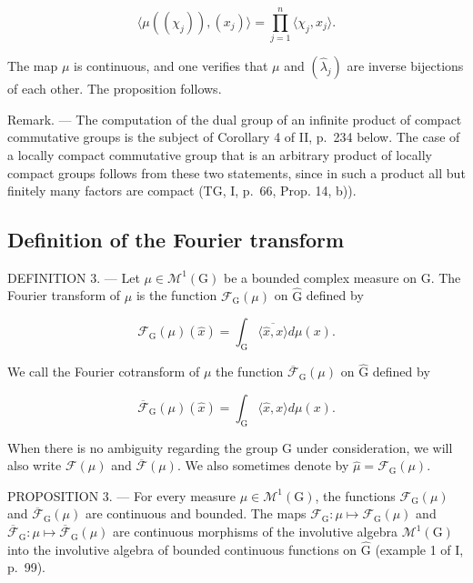\[
\langle \mu ((\chi_ {j})), (x _ {j}) \rangle = \prod_ {j = 1} ^ {n} \langle \chi_ {j}, x _ {j} \rangle .
\]

The map \(\mu\) is continuous, and one verifies that \(\mu\) and \((\widehat{\lambda}_j)\) are inverse bijections of each other. The proposition follows.

Remark. --- The computation of the dual group of an infinite product of compact commutative groups is the subject of Corollary 4 of II, p.~234 below. The case of a locally compact commutative group that is an arbitrary product of locally compact groups follows from these two statements, since in such a product all but finitely many factors are compact (TG, I, p.~66, Prop. 14, b)).

\subsection{Definition of the Fourier transform}

DEFINITION 3. --- Let \(\mu \in \mathcal{M}^{1}(\mathrm{G})\) be a bounded complex measure on G. The Fourier transform of \(\mu\) is the function \(\mathcal{F}_{\mathrm{G}}(\mu)\) on \(\widehat{\mathrm{G}}\) defined by

\[
\mathcal {F} _ {\mathrm{G}} (\mu) (\widehat {x}) = \int_ {\mathrm{G}} \overline {{\langle \widehat {x} , x \rangle}} d \mu (x).\tag{5}
\]

We call the Fourier cotransform of \(\mu\) the function \(\overline{\mathcal{F}}_{\mathrm{G}}(\mu)\) on \(\widehat{\mathrm{G}}\) defined by

\[
\overline {{\mathcal {F}}} _ {\mathrm{G}} (\mu) (\widehat {x}) = \int_ {\mathrm{G}} \langle \widehat {x}, x \rangle d \mu (x).\tag{6}
\]

When there is no ambiguity regarding the group G under consideration, we will also write \(\mathcal{F}(\mu)\) and \(\overline{\mathcal{F}}(\mu)\). We also sometimes denote by \(\widehat{\mu} = \mathcal{F}_{\mathrm{G}}(\mu)\).

PROPOSITION 3. --- For every measure \(\mu \in \mathcal{M}^{1}(\mathrm{G})\), the functions \(\mathcal{F}_{\mathrm{G}}(\mu)\) and \(\overline{\mathcal{F}}_{\mathrm{G}}(\mu)\) are continuous and bounded. The maps \(\mathcal{F}_{\mathrm{G}}: \mu \mapsto \mathcal{F}_{\mathrm{G}}(\mu)\) and \(\overline{\mathcal{F}}_{\mathrm{G}}: \mu \mapsto \overline{\mathcal{F}}_{\mathrm{G}}(\mu)\) are continuous morphisms of the involutive algebra \(\mathcal{M}^{1}(\mathrm{G})\) into the involutive algebra of bounded continuous functions on \(\widehat{\mathrm{G}}\) (example 1 of I, p.~99).

